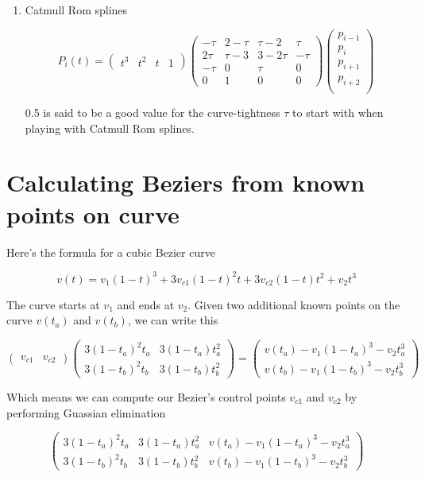 \documentclass[12pt]{article}
\begin{document}
\begin{enumerate}
\item Catmull Rom splines

\[
	P_i(t) = 
	\left(
		\begin{array}{cccc}
			t^3 & t^2 & t & 1
		\end{array}
	\right)
	\left(
		\begin{array}{cccc}
			-\tau & 2 - \tau & \tau - 2 & \tau \\
			2\tau & \tau - 3 & 3 - 2\tau & -\tau \\
			-\tau & 0 & \tau & 0 \\
			0 & 1 & 0 & 0
		\end{array}
	\right)
	\left(
		\begin{array}{c}
			p_{i-1}  \\
			p_{i}     \\
			p_{i+1} \\
			p_{i+2} \\
		\end{array}
	\right)
\]

0.5 is said to be a good value for the curve-tightness $\tau$ to start with when playing with Catmull Rom splines.

\end{enumerate}

\newpage
\section*{Calculating Beziers from known points on curve}

Here's the formula for a cubic Bezier curve

\[
v(t) = v_1(1-t)^3 + 3v_{c1}(1-t)^2t + 3v_{c2}(1-t)t^2 + v_2t^3
\]

The curve starts at $v_1$ and ends at $v_2$.  Given two additional known points on the curve $v(t_a)$ and $v(t_b)$, we can write this

\[
	\left(
		\begin{array}{cc}
			v_{c1} & v_{c2}
		\end{array}
	\right)
	\left(
		\begin{array}{cc}
			3(1-t_a)^2t_a & 3(1-t_a)t_a^2 \\
			3(1-t_b)^2t_b & 3(1-t_b)t_b^2
		\end{array}
	\right)
	=
	\left(
		\begin{array}{c}
			v(t_a) - v_1(1-t_a)^3 - v_2t_a^3 \\
			v(t_b) - v_1(1-t_b)^3 - v_2t_b^3
		\end{array}
	\right)
\]

Which means we can compute our Bezier's control points $v_{c1}$ and $v_{c2}$ by performing Guassian elimination

\[
	\left(
		\begin{array}{cc|c}
			3(1-t_a)^2t_a & 3(1-t_a)t_a^2 & v(t_a) - v_1(1-t_a)^3 - v_2t_a^3 \\
			3(1-t_b)^2t_b & 3(1-t_b)t_b^2 & v(t_b) - v_1(1-t_b)^3 - v_2t_b^3
		\end{array}
	\right)
\]
\end{document}
